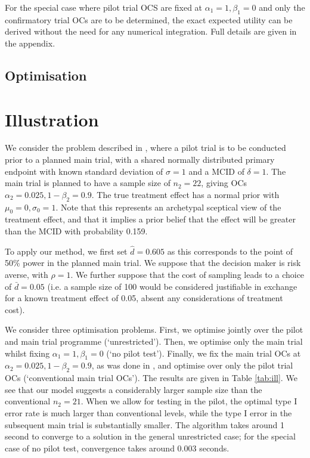 \documentclass[sagev]{sagej}
\begin{document}
For the special case where pilot trial OCS are fixed at $\alpha_1 = 1, \beta_1 = 0$ and only the confirmatory trial OCs are to be determined, the exact expected utility can be derived without the need for any numerical integration. Full details are given in the appendix.

\subsection{Optimisation}\label{sec:optimisation}



\section{Illustration}

We consider the problem described in \cite{Stallard2012}, where a pilot trial is to be conducted prior to a planned main trial, with a shared normally distributed primary endpoint with known standard deviation of $\sigma = 1$ and a MCID of $\delta = 1$. The main trial is planned to have a sample size of $n_2 = 22$, giving OCs $\alpha_2 = 0.025, 1 - \beta_2 = 0.9$. The true treatment effect has a normal prior with $\mu_0 = 0, \sigma_0 = 1$. Note that this represents an archetypal sceptical view of the treatment effect, and that it implies a prior belief that the effect will be greater than the MCID with probability 0.159.

To apply our method, we first set $\hat{d} = 0.605$ as this corresponds to the point of 50\% power in the planned main trial. We suppose that the decision maker is risk averse, with $\rho = 1$. We further suppose that the cost of sampling leads to a choice of $\bar{d} = 0.05$ (i.e. a sample size of 100 would be considered justifiable in exchange for a known treatment effect of 0.05, absent any considerations of treatment cost).

We consider three optimisation problems. First, we optimise jointly over the pilot and main trial programme (`unrestricted'). Then, we optimise only the main trial whilst fixing $\alpha_1 = 1, \beta_1 = 0$ (`no pilot test'). Finally, we fix the main trial OCs at $\alpha_2 = 0.025, 1 - \beta_2 = 0.9$, as was done in \cite{Stallard2012}, and optimise over only the pilot trial OCs (`conventional main trial OCs'). The results are given in Table \ref{tab:ill}. We see that our model suggests a considerably larger sample size than the conventional $n_2 = 21$. When we allow for testing in the pilot, the optimal type I error rate is much larger than conventional levels, while the type I error in the subsequent main trial is substantially smaller. The algorithm takes around 1 second to converge to a solution in the general unrestricted case; for the special case of no pilot test, convergence takes around 0.003 seconds.
\end{document}
